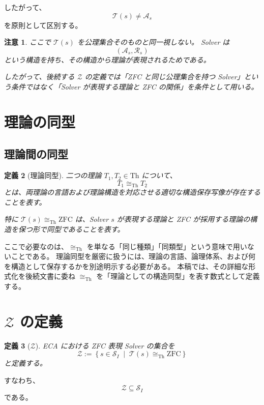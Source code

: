 \documentclass[a4paper,11pt]{jsarticle}
\newtheorem{definition}{定義}[section]
\newtheorem{remark}[definition]{注意}
\newcommand{\Solver}{\mathcal{S}}
\newcommand{\Th}{\mathrm{Th}}
\begin{document}
したがって、
\[
\mathcal{T}(s)
\neq
\mathcal{A}_s
\]
を原則として区別する。

\begin{remark}
ここで $\mathcal{T}(s)$ を公理集合そのものと同一視しない。
Solver は
\[
(\mathcal{A}_s,\mathcal{R}_s)
\]
という構造を持ち、その構造から理論が表現されるためである。

したがって、後続する $\mathcal{Z}$ の定義では「ZFC と同じ公理集合を持つ Solver」という条件ではなく「Solver が表現する理論と ZFC の関係」を条件として用いる。
\end{remark}

\section{理論の同型}

\subsection{理論間の同型}

\begin{definition}[理論同型]
二つの理論 $T_1,T_2\in\Th$ について、
\[
T_1\cong_{\mathrm{Th}}T_2
\]
とは、両理論の言語および理論構造を対応させる適切な構造保存写像が存在することを表す。

特に $\mathcal{T}(s)\cong_{\mathrm{Th}}\mathrm{ZFC}$ は、Solver $s$ が表現する理論と ZFC が採用する理論の構造を保つ形で同型であることを表す。
\end{definition}

ここで必要なのは、$\cong_{\mathrm{Th}}$ を単なる「同じ種類」「同類型」という意味で用いないことである。
理論同型を厳密に扱うには、理論の言語、論理体系、および何を構造として保存するかを別途明示する必要がある。
本稿では、その詳細な形式化を後続文書に委ね $\cong_{\mathrm{Th}}$ を「理論としての構造同型」を表す数式として定義する。

\section{$\mathcal{Z}$ の定義}

\begin{definition}[$\mathcal{Z}$]
ECA における ZFC 表現 Solver の集合を
\[
\boxed{
\mathcal{Z}
:=
\left\{
s\in\Solver_I
\;\middle|\;
\mathcal{T}(s)\cong_{\mathrm{Th}}\mathrm{ZFC}
\right\}
}
\]
と定義する。
\end{definition}

すなわち、
\[
\boxed{
\mathcal{Z}\subseteq\Solver_I
}
\]
である。
\end{document}
